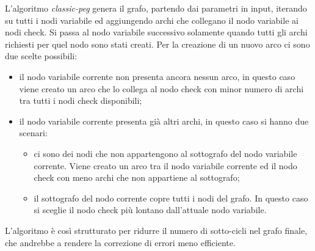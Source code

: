 L'algoritmo \textit{classic-peg} genera il grafo, partendo dai parametri in input, iterando su tutti i nodi variabile ed aggiungendo archi che collegano il nodo variabile ai nodi check. Si passa al nodo variabile successivo solamente quando tutti gli archi richiesti per quel nodo sono stati creati. Per la creazione di un nuovo arco ci sono due scelte possibili:
\begin{itemize}
\item il nodo variabile corrente non presenta ancora nessun arco, in questo caso viene creato un arco che lo collega al nodo check con minor numero di archi tra tutti i nodi check disponibili;
\item il nodo variabile corrente presenta gi\`a altri archi, in questo caso si hanno due scenari:
\begin{itemize}
\item ci sono dei nodi che non appartengono al sottografo del nodo variabile corrente. Viene creato un arco tra il nodo variabile corrente ed il nodo check con meno archi che non appartiene al sottografo;
\item il sottografo del nodo corrente copre tutti i nodi del grafo. In questo caso si sceglie il nodo check pi\`u lontano dall'attuale nodo variabile.
\end{itemize}
\end{itemize}

L'algoritmo è così strutturato per ridurre il numero di sotto-cicli nel grafo finale, che andrebbe a rendere la correzione di errori meno efficiente.

